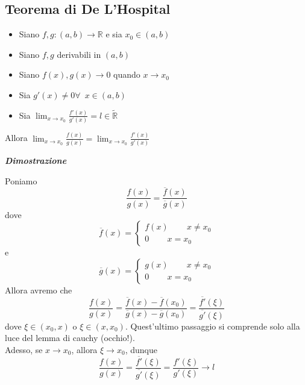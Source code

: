 \documentclass{article}
\theoremstyle{definition}
\newcommand{\R}{\mathbb{R}}
\begin{document}
\subsection{Teorema di De L'Hospital}
\begin{itemize}
    \item Siano $f,g: (a,b) \to \R$ e sia $x_0 \in (a,b)$
    \item Siano $f,g$ derivabili in $(a,b)$
    \item Siano $f(x),g(x) \to 0$ quando $x \to x_0$
    \item Sia $g'(x) \neq 0 \forall \,\,\, x\in (a,b)$
    \item Sia $\lim_{x \to x_0}\frac{f'(x)}{g'(x)}=l \in \tilde{\R}$
\end{itemize}
Allora $\lim_{x \to x_0}\frac{f(x)}{g(x)}=\lim_{x \to x_0}\frac{f'(x)}{g'(x)}$
\begin{center}
    \textbf{\textit{Dimostrazione}}
\end{center}
Poniamo 
\begin{equation}
    \frac{f(x)}{g(x)}=\frac{\overline{f}(x)}{\overline{g}(x)}
\end{equation}
dove
\begin{equation}
    \overline{f}(x)=\begin{cases}
        f(x) \,\,\,\,\,\,\,\,\,\,\,\,\, x \neq x_0 \\
        0  \,\,\,\,\,\,\,\,\,\,\,\,\, x=x_0
    \end{cases}
    \end{equation}
    e
    \begin{equation}
        \overline{g}(x)=\begin{cases}
            g(x) \,\,\,\,\,\,\,\,\,\,\,\,\, x \neq x_0 \\
            0 \,\,\,\,\,\,\,\,\,\,\,\,\, x = x_0
        \end{cases}
    \end{equation}
Allora avremo che
\begin{equation}
    \frac{f(x)}{g(x)}=\frac{\overline{f}(x)-\overline{f}(x_0)}{\overline{g}(x)-\overline{g}(x_0)}=\frac{\overline{f'}(\xi)}{\overline{g'}(\xi)}
\end{equation}
dove $\xi \in (x_0, x)$ o $\xi \in (x, x_0)$. Quest'ultimo passaggio si comprende solo alla luce del lemma di cauchy (occhio!).
\\
Adesso, se $x \to x_0$, allora $\xi \to x_0$, dunque
\begin{equation}
    \frac{f(x)}{g(x)}=\frac{\overline{f'}(\xi)}{\overline{g'}(\xi)}=\frac{f'(\xi)}{g'(\xi)} \to l
\end{equation}
\newpage
\end{document}
